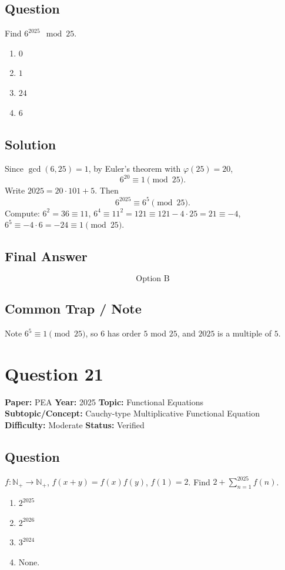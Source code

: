\documentclass[11pt]{article}
\begin{document}
\subsection*{Question}
Find $6^{2025} \mod 25$.
\begin{enumerate}[label=(\Alph*)]
\item $0$ \item $1$ \item $24$ \item $6$
\end{enumerate}

\subsection*{Solution}
Since $\gcd(6,25)=1$, by Euler's theorem with $\varphi(25)=20$,
\[
6^{20} \equiv 1 \pmod{25}.
\]
Write $2025 = 20\cdot 101 + 5$. Then
\[
6^{2025} \equiv 6^{5} \pmod{25}.
\]
Compute: $6^2 = 36 \equiv 11$, $6^4 \equiv 11^2 = 121 \equiv 121 - 4\cdot 25 = 21 \equiv -4$, $6^5 \equiv -4 \cdot 6 = -24 \equiv 1 \pmod{25}$.

\subsection*{Final Answer}
\[
\boxed{\text{Option B}}
\]

\subsection*{Common Trap / Note}
Note $6^5 \equiv 1 \pmod{25}$, so $6$ has order $5$ mod $25$, and $2025$ is a multiple of $5$.

\section*{Question 21}
\textbf{Paper:} PEA \quad \textbf{Year:} 2025 \quad \textbf{Topic:} Functional Equations \\
\textbf{Subtopic/Concept:} Cauchy-type Multiplicative Functional Equation \\
\textbf{Difficulty:} Moderate \quad \textbf{Status:} Verified

\subsection*{Question}
$f : \mathbb{N}_+ \to \mathbb{N}_+$, $f(x+y) = f(x) f(y)$, $f(1) = 2$. Find $2 + \sum_{n=1}^{2025} f(n)$.
\begin{enumerate}[label=(\Alph*)]
\item $2^{2025}$ \item $2^{2026}$ \item $3^{2024}$ \item None.
\end{enumerate}
\end{document}
